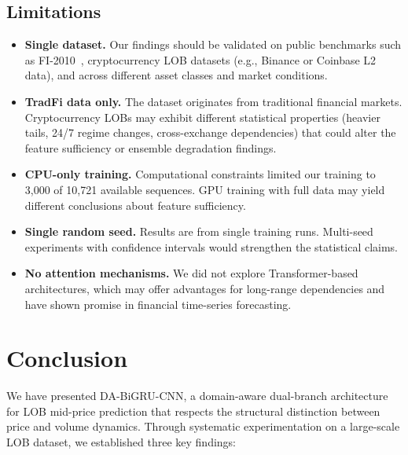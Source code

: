 \documentclass[11pt,a4paper]{article}
\newcommand{\methodname}{DA-BiGRU-CNN}
\begin{document}
\subsection{Limitations}

\begin{itemize}[itemsep=0.2em]
    \item \textbf{Single dataset.} Our findings should be validated on public benchmarks such as FI-2010~\cite{ntakaris2018benchmark}, cryptocurrency LOB datasets (e.g., Binance or Coinbase L2 data), and across different asset classes and market conditions.
    \item \textbf{TradFi data only.} The dataset originates from traditional financial markets. Cryptocurrency LOBs may exhibit different statistical properties (heavier tails, 24/7 regime changes, cross-exchange dependencies) that could alter the feature sufficiency or ensemble degradation findings.
    \item \textbf{CPU-only training.} Computational constraints limited our training to 3{,}000 of 10{,}721 available sequences. GPU training with full data may yield different conclusions about feature sufficiency.
    \item \textbf{Single random seed.} Results are from single training runs. Multi-seed experiments with confidence intervals would strengthen the statistical claims.
    \item \textbf{No attention mechanisms.} We did not explore Transformer-based architectures, which may offer advantages for long-range dependencies and have shown promise in financial time-series forecasting.
\end{itemize}


\section{Conclusion}
\label{sec:conclusion}

We have presented \methodname{}, a domain-aware dual-branch architecture for LOB mid-price prediction that respects the structural distinction between price and volume dynamics. Through systematic experimentation on a large-scale LOB dataset, we established three key findings:
\end{document}
